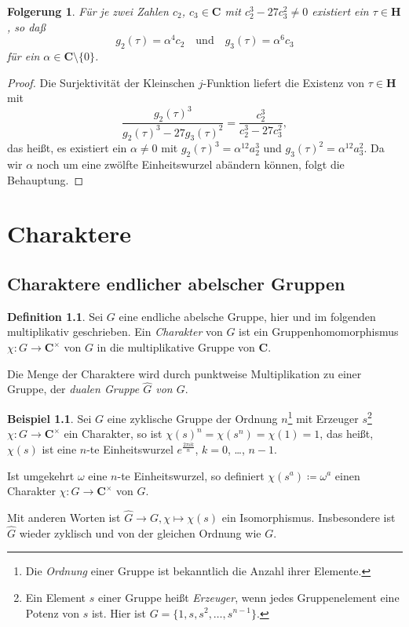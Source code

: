 \documentclass[a4paper,twoside,openright]{report}
\newtheorem{cor}[thm]{Folgerung}
\theoremstyle{definition}
\newtheorem{dfn}[thm]{Definition}
\newtheorem{xca}[thm]{Beispiel}
\theoremstyle{remark}
\begin{document}
\begin{cor}
  Für je zwei Zahlen $c_2$, $c_3 \in \mathbf C$ mit $c_2^3 - 27 c_3^2 \neq 0$ existiert
  ein $\tau \in \mathbf H$, so daß
  \[
    g_2(\tau) = \alpha^4 c_2\quad\text{und}\quad g_3(\tau) = \alpha^6 c_3
  \]
  für ein $\alpha \in \mathbf C \setminus \{0\}$.
\end{cor}

\begin{proof}
  Die Surjektivität der Kleinschen $j$-Funktion liefert die Existenz von
  $\tau \in \mathbf H$ mit
  \[
    \frac{g_2(\tau)^3}{g_2(\tau)^3 - 27 g_3(\tau)^2} = \frac{c_2^3}{c_2^3 - 27 c_3^2},
  \] 
  das heißt, es existiert ein $\alpha \neq 0$ mit
  $g_2(\tau)^3 = \alpha^{12} a_2^3$ und $g_3(\tau)^2 = \alpha^{12} a_3^2$. Da
  wir $\alpha$ noch um eine zwölfte Einheitswurzel abändern können, folgt die
  Behauptung.
\end{proof}

\appendix

\chapter{Charaktere}

\section{Charaktere endlicher abelscher Gruppen}

\begin{dfn}
  Sei $G$ eine endliche abelsche Gruppe, hier und im folgenden multiplikativ geschrieben. Ein \emph{Charakter}
  von $G$ ist ein Gruppenhomomorphismus $\chi\colon G \to \mathbf C^\times$ von $G$ in die multiplikative
  Gruppe von $\mathbf C$.
  
  Die Menge der Charaktere wird durch punktweise Multiplikation zu einer Gruppe, der \emph{dualen Gruppe
  $\widehat G$ von $G$}.
\end{dfn}

\begin{xca}
  \label{xca:cyclic}
  Sei $G$ eine zyklische Gruppe der Ordnung $n$\footnote{Die \emph{Ordnung} einer Gruppe ist bekanntlich
  die Anzahl ihrer Elemente.} mit Erzeuger $s$\footnote{Ein Element $s$ einer Gruppe heißt \emph{Erzeuger},
  wenn jedes Gruppenelement eine Potenz von $s$ ist. Hier ist $G = \{1, s, s^2, \dotsc, s^{n - 1}\}$.}
  $\chi\colon G \to \mathbf C^\times$ ein Charakter, so ist $\chi(s)^n = \chi(s^n) = \chi(1) = 1$,
  das heißt, $\chi(s)$ ist eine $n$-te Einheitswurzel $e^{\frac{2 \pi i k}n}$,
  $k = 0$, \dots, $n - 1$.
  
  Ist umgekehrt $\omega$ eine $n$-te Einheitswurzel, so definiert $\chi(s^a) \coloneqq \omega^a$
  einen Charakter $\chi\colon G \to \mathbf C^\times$ von $G$.
  
  Mit anderen Worten ist $\widehat G \to G, \chi \mapsto \chi(s)$
  ein Isomorphismus. Insbesondere ist $\widehat G$ wieder zyklisch und von der
  gleichen Ordnung wie $G$.
\end{xca}
\end{document}
